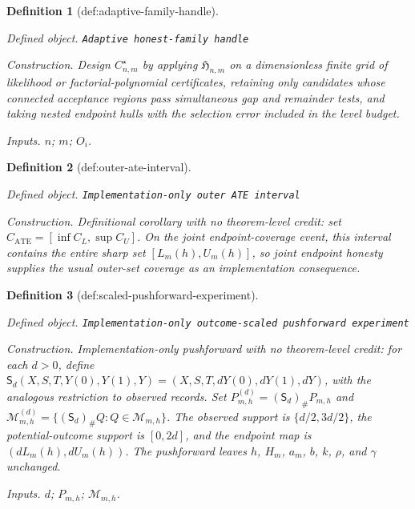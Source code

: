 \documentclass{article}
\newtheorem{definition}{Definition}
\begin{document}
\begin{definition}[def:adaptive-family-handle]\label{def:adaptive-family-handle}
\par\smallskip\noindent\emph{Defined object.} \texttt{Adaptive honest-\allowbreak{}family handle}
\par\smallskip\noindent\emph{Construction.} Design \(C_{n,m}^{\star}\) by applying \(\mathfrak H_{n,m}\) on a dimensionless finite grid of likelihood or factorial-polynomial certificates, retaining only candidates whose connected acceptance regions pass simultaneous gap and remainder tests, and taking nested endpoint hulls with the selection error included in the level budget.
\par\smallskip\noindent\emph{Inputs.} \(n\); \(m\); \(O_i\).
\end{definition}

\begin{definition}[def:outer-ate-interval]\label{def:outer-ate-interval}
\par\smallskip\noindent\emph{Defined object.} \texttt{Implementation-\allowbreak{}only outer ATE interval}
\par\smallskip\noindent\emph{Construction.} Definitional corollary with no theorem-level credit: set \(C_{\mathrm{ATE}}=[\inf C_L,\sup C_U]\). On the joint endpoint-coverage event, this interval contains the entire sharp set \([L_m(h),U_m(h)]\), so joint endpoint honesty supplies the usual outer-set coverage as an implementation consequence.
\end{definition}

\begin{definition}[def:scaled-pushforward-experiment]\label{def:scaled-pushforward-experiment}
\par\smallskip\noindent\emph{Defined object.} \texttt{Implementation-\allowbreak{}only outcome-\allowbreak{}scaled pushforward experiment}
\par\smallskip\noindent\emph{Construction.} Implementation-only pushforward with no theorem-level credit: for each \(d>0\), define \(\mathsf S_d(X,S,T,Y(0),Y(1),Y)=(X,S,T,dY(0),dY(1),dY)\), with the analogous restriction to observed records. Set \(P^{(d)}_{m,h}=(\mathsf S_d)_{\#}P_{m,h}\) and \(\mathcal M^{(d)}_{m,h}=\{(\mathsf S_d)_{\#}Q:Q\in\mathcal M_{m,h}\}\). The observed support is \(\{d/2,3d/2\}\), the potential-outcome support is \([0,2d]\), and the endpoint map is \((dL_m(h),dU_m(h))\). The pushforward leaves \(h\), \(H_m\), \(a_m\), \(b\), \(k\), \(\rho\), and \(\gamma\) unchanged.
\par\smallskip\noindent\emph{Inputs.} \(d\); \(P_{m,h}\); \(\mathcal M_{m,h}\).
\end{definition}
\end{document}
